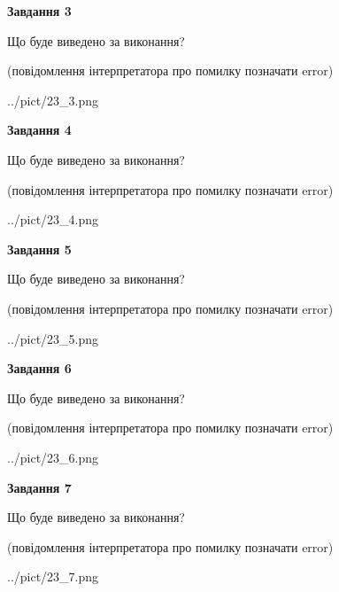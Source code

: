 \documentclass[12pt, ukrainian]{article}
\begin{document}
{\begin {large}
{\begin {center}\textbf{Завдання 3}\end {center}}\par
Що буде виведено за виконання?\par
 (повідомлення інтерпретатора про помилку позначати error)\par
\begin{center}
	{../pict/23_3.png}
\end{center}
\newpage

{\begin {center}\textbf{Завдання 4}\end {center}}\par
Що буде виведено за виконання?\par
 (повідомлення інтерпретатора про помилку позначати error)\par
\begin{center}
	{../pict/23_4.png}
\end{center}
\newpage

{\begin {center}\textbf{Завдання 5}\end {center}}\par
Що буде виведено за виконання?\par
 (повідомлення інтерпретатора про помилку позначати error)\par
\begin{center}
	{../pict/23_5.png}
\end{center}
\newpage

{\begin {center}\textbf{Завдання 6}\end {center}}\par
Що буде виведено за виконання?\par
 (повідомлення інтерпретатора про помилку позначати error)\par
\begin{center}
	{../pict/23_6.png}
\end{center}
\newpage

{\begin {center}\textbf{Завдання 7}\end {center}}\par
Що буде виведено за виконання?\par
 (повідомлення інтерпретатора про помилку позначати error)\par
\begin{center}
	{../pict/23_7.png}
\end{center}
\newpage


\end{large}}
\end{document}
